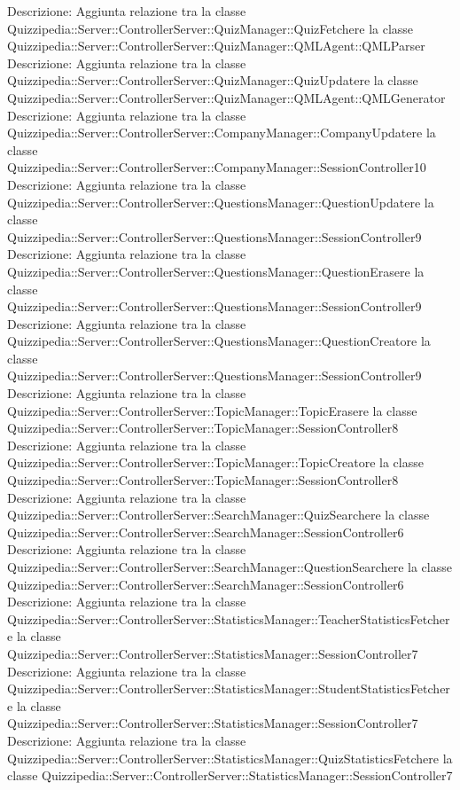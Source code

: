 Descrizione: Aggiunta relazione tra la classe Quizzipedia::Server::ControllerServer::QuizManager::QuizFetchere la classe Quizzipedia::Server::ControllerServer::QuizManager::QMLAgent::QMLParser 
Descrizione: Aggiunta relazione tra la classe Quizzipedia::Server::ControllerServer::QuizManager::QuizUpdatere la classe Quizzipedia::Server::ControllerServer::QuizManager::QMLAgent::QMLGenerator 
Descrizione: Aggiunta relazione tra la classe Quizzipedia::Server::ControllerServer::CompanyManager::CompanyUpdatere la classe Quizzipedia::Server::ControllerServer::CompanyManager::SessionController10 
Descrizione: Aggiunta relazione tra la classe Quizzipedia::Server::ControllerServer::QuestionsManager::QuestionUpdatere la classe Quizzipedia::Server::ControllerServer::QuestionsManager::SessionController9 
Descrizione: Aggiunta relazione tra la classe Quizzipedia::Server::ControllerServer::QuestionsManager::QuestionErasere la classe Quizzipedia::Server::ControllerServer::QuestionsManager::SessionController9 
Descrizione: Aggiunta relazione tra la classe Quizzipedia::Server::ControllerServer::QuestionsManager::QuestionCreatore la classe Quizzipedia::Server::ControllerServer::QuestionsManager::SessionController9 
Descrizione: Aggiunta relazione tra la classe Quizzipedia::Server::ControllerServer::TopicManager::TopicErasere la classe Quizzipedia::Server::ControllerServer::TopicManager::SessionController8 
Descrizione: Aggiunta relazione tra la classe Quizzipedia::Server::ControllerServer::TopicManager::TopicCreatore la classe Quizzipedia::Server::ControllerServer::TopicManager::SessionController8 
Descrizione: Aggiunta relazione tra la classe Quizzipedia::Server::ControllerServer::SearchManager::QuizSearchere la classe Quizzipedia::Server::ControllerServer::SearchManager::SessionController6 
Descrizione: Aggiunta relazione tra la classe Quizzipedia::Server::ControllerServer::SearchManager::QuestionSearchere la classe Quizzipedia::Server::ControllerServer::SearchManager::SessionController6 
Descrizione: Aggiunta relazione tra la classe Quizzipedia::Server::ControllerServer::StatisticsManager::TeacherStatisticsFetchere la classe Quizzipedia::Server::ControllerServer::StatisticsManager::SessionController7 
Descrizione: Aggiunta relazione tra la classe Quizzipedia::Server::ControllerServer::StatisticsManager::StudentStatisticsFetchere la classe Quizzipedia::Server::ControllerServer::StatisticsManager::SessionController7 
Descrizione: Aggiunta relazione tra la classe Quizzipedia::Server::ControllerServer::StatisticsManager::QuizStatisticsFetchere la classe Quizzipedia::Server::ControllerServer::StatisticsManager::SessionController7 
